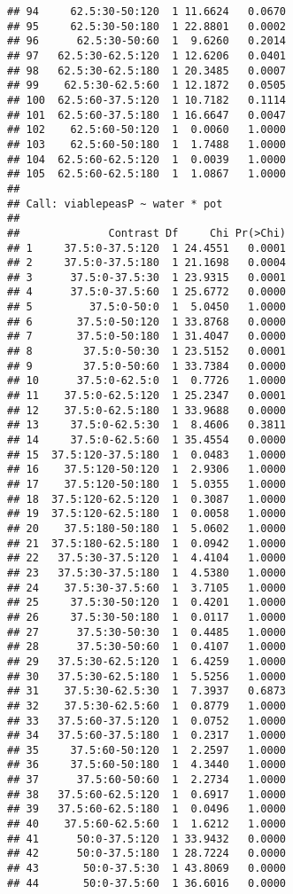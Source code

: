\begin{knitrout}
\begin{kframe}
\begin{verbatim}
## 94     62.5:30-50:120  1 11.6624   0.0670
## 95     62.5:30-50:180  1 22.8801   0.0002
## 96      62.5:30-50:60  1  9.6260   0.2014
## 97   62.5:30-62.5:120  1 12.6206   0.0401
## 98   62.5:30-62.5:180  1 20.3485   0.0007
## 99    62.5:30-62.5:60  1 12.1872   0.0505
## 100  62.5:60-37.5:120  1 10.7182   0.1114
## 101  62.5:60-37.5:180  1 16.6647   0.0047
## 102    62.5:60-50:120  1  0.0060   1.0000
## 103    62.5:60-50:180  1  1.7488   1.0000
## 104  62.5:60-62.5:120  1  0.0039   1.0000
## 105  62.5:60-62.5:180  1  1.0867   1.0000
## 
## Call: viablepeasP ~ water * pot
## 
##              Contrast Df     Chi Pr(>Chi)
## 1     37.5:0-37.5:120  1 24.4551   0.0001
## 2     37.5:0-37.5:180  1 21.1698   0.0004
## 3      37.5:0-37.5:30  1 23.9315   0.0001
## 4      37.5:0-37.5:60  1 25.6772   0.0000
## 5         37.5:0-50:0  1  5.0450   1.0000
## 6       37.5:0-50:120  1 33.8768   0.0000
## 7       37.5:0-50:180  1 31.4047   0.0000
## 8        37.5:0-50:30  1 23.5152   0.0001
## 9        37.5:0-50:60  1 33.7384   0.0000
## 10      37.5:0-62.5:0  1  0.7726   1.0000
## 11    37.5:0-62.5:120  1 25.2347   0.0001
## 12    37.5:0-62.5:180  1 33.9688   0.0000
## 13     37.5:0-62.5:30  1  8.4606   0.3811
## 14     37.5:0-62.5:60  1 35.4554   0.0000
## 15  37.5:120-37.5:180  1  0.0483   1.0000
## 16    37.5:120-50:120  1  2.9306   1.0000
## 17    37.5:120-50:180  1  5.0355   1.0000
## 18  37.5:120-62.5:120  1  0.3087   1.0000
## 19  37.5:120-62.5:180  1  0.0058   1.0000
## 20    37.5:180-50:180  1  5.0602   1.0000
## 21  37.5:180-62.5:180  1  0.0942   1.0000
## 22   37.5:30-37.5:120  1  4.4104   1.0000
## 23   37.5:30-37.5:180  1  4.5380   1.0000
## 24    37.5:30-37.5:60  1  3.7105   1.0000
## 25     37.5:30-50:120  1  0.4201   1.0000
## 26     37.5:30-50:180  1  0.0117   1.0000
## 27      37.5:30-50:30  1  0.4485   1.0000
## 28      37.5:30-50:60  1  0.4107   1.0000
## 29   37.5:30-62.5:120  1  6.4259   1.0000
## 30   37.5:30-62.5:180  1  5.5256   1.0000
## 31    37.5:30-62.5:30  1  7.3937   0.6873
## 32    37.5:30-62.5:60  1  0.8779   1.0000
## 33   37.5:60-37.5:120  1  0.0752   1.0000
## 34   37.5:60-37.5:180  1  0.2317   1.0000
## 35     37.5:60-50:120  1  2.2597   1.0000
## 36     37.5:60-50:180  1  4.3440   1.0000
## 37      37.5:60-50:60  1  2.2734   1.0000
## 38   37.5:60-62.5:120  1  0.6917   1.0000
## 39   37.5:60-62.5:180  1  0.0496   1.0000
## 40    37.5:60-62.5:60  1  1.6212   1.0000
## 41      50:0-37.5:120  1 33.9432   0.0000
## 42      50:0-37.5:180  1 28.7224   0.0000
## 43       50:0-37.5:30  1 43.8069   0.0000
## 44       50:0-37.5:60  1 36.6016   0.0000

\end{verbatim}
\end{kframe}
\end{knitrout}
